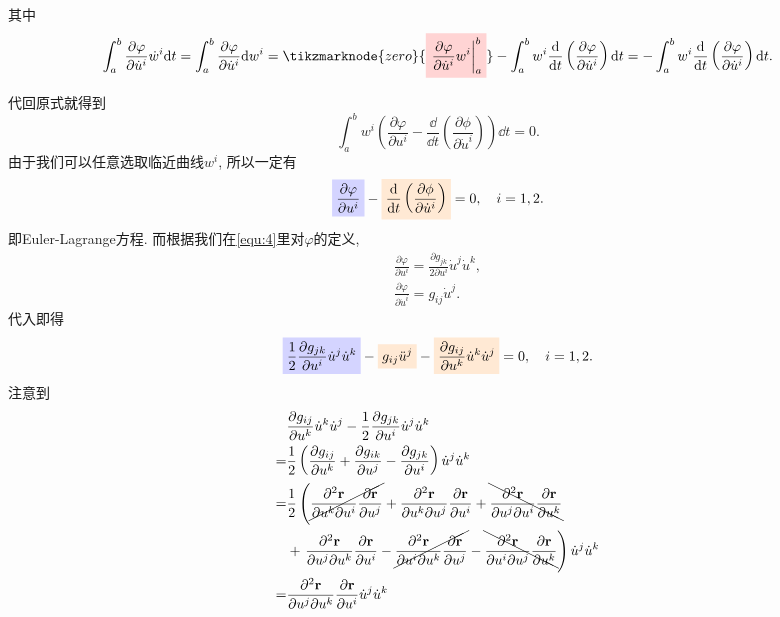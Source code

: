 \documentclass[./main.tex]{subfiles}
\begin{document}
其中
\[
    \int_a^b \frac{\partial\varphi}{\partial\dot u^i}\dot w^i\dd t=\int_a^b\frac{\partial\varphi}{\partial\dot u^i}\dd w^i=\tikzmarknode{zero}{\highlight{red}{\displaystyle\left.\frac{\partial\varphi}{\partial\dot u^i}w^i\right|_a^b}}-\int_a^bw^i\frac{\dd}{\dd t}\left(\frac{\partial\varphi}{\partial\dot u^i}\right)\dd t=-\int_a^bw^i\frac{\dd}{\dd t}\left(\frac{\partial\varphi}{\partial\dot u^i}\right)\dd t.
\]
代回原式就得到
\[
    \int_a^bw^i\left(\frac{\partial\varphi}{\partial u^i}-\frac{\dd}{\dd t}\left(\frac{\partial\phi}{\partial\dot u^i}\right)\right)\dd t=0.
\]
由于我们可以任意选取临近曲线\(w^i\), 所以一定有
\[
    \highlight{blue}{\displaystyle\frac{\partial\varphi}{\partial u^i}}-\highlight{orange}{\displaystyle\frac{\dd}{\dd t}\left(\frac{\partial\phi}{\partial\dot u^i}\right)}=0,\quad i=1,2.
\]
即Euler-Lagrange方程. 而根据我们在\eqref{equ:4}里对\(\varphi\)的定义,
\begin{gather*}
    \frac{\partial\varphi}{\partial u^i}=\frac{\partial g_{jk}}{2\partial u^i}\dot u^j\dot u^k,\\
    \frac{\partial\varphi}{\partial\dot u^i}=g_{ij}\dot u^j.
\end{gather*}
代入即得
\[
    \highlight{blue}{\displaystyle\frac12\frac{\partial g_{jk}}{\partial u^i}\dot u^j\dot u^k}-\highlight{orange}{\displaystyle g_{ij}\ddot u^j}-\highlight{orange}{\displaystyle\frac{\partial g_{ij}}{\partial u^k}\dot u^k\dot u^j}=0,\quad i=1,2.
\]
注意到
\begin{align*}
    &\frac{\partial g_{ij}}{\partial u^k}\dot u^k\dot u^j-\frac12\frac{\partial g_{jk}}{\partial u^i}\dot u^j\dot u^k\\
    =&\frac{1}{2}\left(\frac{\partial g_{ij}}{\partial u^k}+\frac{\partial g_{ik}}{\partial u^j}-\frac{\partial g_{jk}}{\partial u^i}\right)\dot u^j\dot u^k\\
    =&\frac{1}{2}\left(\cancel{\frac{\partial^2\mathbf{r}}{\partial u^k\partial u^i}\frac{\partial\mathbf{r}}{\partial u^j}}+\frac{\partial^2\mathbf{r}}{\partial u^k\partial u^j}\frac{\partial\mathbf{r}}{\partial u^i}+\bcancel{\frac{\partial^2\mathbf{r}}{\partial u^j\partial u^i}\frac{\partial\mathbf{r}}{\partial u^k}}\right.\\
     &+\left.\frac{\partial^2\mathbf{r}}{\partial u^j\partial u^k}\frac{\partial\mathbf{r}}{\partial u^i}-\cancel{\frac{\partial^2\mathbf{r}}{\partial u^i\partial u^k}\frac{\partial\mathbf{r}}{\partial u^j}}-\bcancel{\frac{\partial^2\mathbf{r}}{\partial u^i\partial u^j}\frac{\partial\mathbf{r}}{\partial u^k}}\right)\dot u^j\dot u^k\\
    =&\frac{\partial^2\mathbf{r}}{\partial u^j\partial u^k}\frac{\partial\mathbf{r}}{\partial u^i}\dot u^j\dot u^k
\end{align*}
\end{document}
